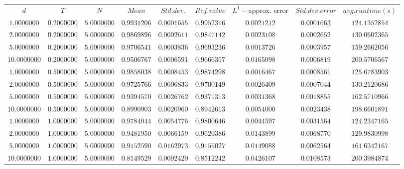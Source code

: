 \begin{tabular}{ccccccccc}
$d$ & $T$ & $N$ & $Mean$ & $Std. dev.$ & $Ref. value$ & $L^1-$approx. error & $Std. dev. error$ & $avg. runtime (s)$\\
$1.0000000$ & $0.2000000$ & $5.0000000$ & $0.9931206$ & $0.0001655$ & $0.9952316$ & $0.0021212$ & $0.0001663$ & $124.1352854$\\
$2.0000000$ & $0.2000000$ & $5.0000000$ & $0.9869896$ & $0.0002611$ & $0.9847142$ & $0.0023108$ & $0.0002652$ & $130.0602365$\\
$5.0000000$ & $0.2000000$ & $5.0000000$ & $0.9706541$ & $0.0003836$ & $0.9693236$ & $0.0013726$ & $0.0003957$ & $159.2662056$\\
$10.0000000$ & $0.2000000$ & $5.0000000$ & $0.9506767$ & $0.0006591$ & $0.9666357$ & $0.0165098$ & $0.0006819$ & $200.5706567$\\
$1.0000000$ & $0.5000000$ & $5.0000000$ & $0.9858038$ & $0.0008453$ & $0.9874298$ & $0.0016467$ & $0.0008561$ & $125.6783903$\\
$2.0000000$ & $0.5000000$ & $5.0000000$ & $0.9725766$ & $0.0006833$ & $0.9700149$ & $0.0026409$ & $0.0007044$ & $130.2120686$\\
$5.0000000$ & $0.5000000$ & $5.0000000$ & $0.9394570$ & $0.0026762$ & $0.9371313$ & $0.0031368$ & $0.0018855$ & $162.5710966$\\
$10.0000000$ & $0.5000000$ & $5.0000000$ & $0.8990903$ & $0.0020960$ & $0.8942613$ & $0.0054000$ & $0.0023438$ & $198.6601891$\\
$1.0000000$ & $1.0000000$ & $5.0000000$ & $0.9784044$ & $0.0054776$ & $0.9800646$ & $0.0044597$ & $0.0031564$ & $124.2347165$\\
$2.0000000$ & $1.0000000$ & $5.0000000$ & $0.9481950$ & $0.0066159$ & $0.9620386$ & $0.0143899$ & $0.0068770$ & $129.9830998$\\
$5.0000000$ & $1.0000000$ & $5.0000000$ & $0.9152590$ & $0.0162973$ & $0.9155027$ & $0.0149088$ & $0.0062564$ & $161.6342167$\\
$10.0000000$ & $1.0000000$ & $5.0000000$ & $0.8149529$ & $0.0092420$ & $0.8512242$ & $0.0426107$ & $0.0108573$ & $200.3984874$\\
\end{tabular}
